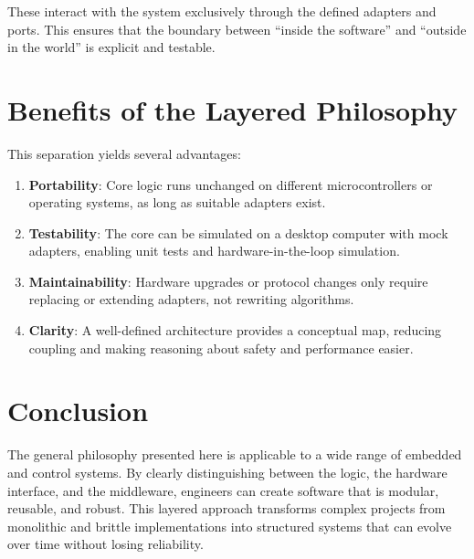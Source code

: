 These interact with the system exclusively through the defined adapters and ports. 
This ensures that the boundary between ``inside the software'' and ``outside in the world'' is explicit and testable.

\section{Benefits of the Layered Philosophy}

This separation yields several advantages:
\begin{enumerate}
    \item \textbf{Portability}: Core logic runs unchanged on different microcontrollers or operating systems, as long as suitable adapters exist.
    \item \textbf{Testability}: The core can be simulated on a desktop computer with mock adapters, enabling unit tests and hardware-in-the-loop simulation.
    \item \textbf{Maintainability}: Hardware upgrades or protocol changes only require replacing or extending adapters, not rewriting algorithms.
    \item \textbf{Clarity}: A well-defined architecture provides a conceptual map, reducing coupling and making reasoning about safety and performance easier.
\end{enumerate}

\section{Conclusion}

The general philosophy presented here is applicable to a wide range of embedded and control systems. 
By clearly distinguishing between the logic, the hardware interface, and the middleware, engineers can create software that is modular, reusable, and robust. 
This layered approach transforms complex projects from monolithic and brittle implementations into structured systems that can evolve over time without losing reliability.

